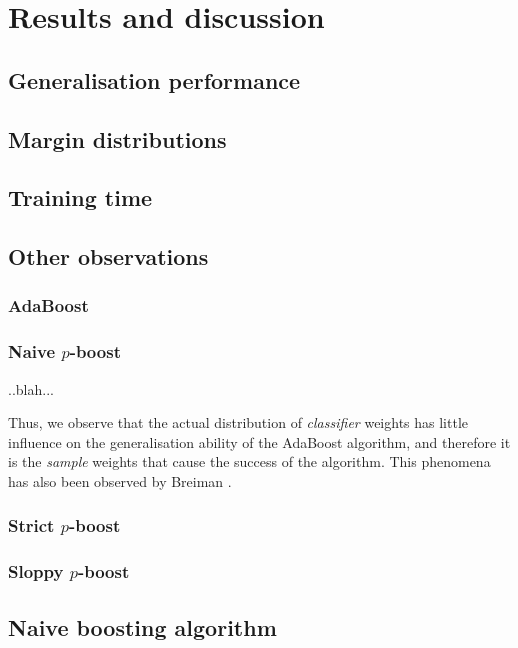 
\chapter{Results and discussion}
\label{chapter:results}

\section{Generalisation performance}


\section{Margin distributions}

\section{Training time}

\section{Other observations}

\subsection{AdaBoost}

\subsection{Naive $p$-boost}

..blah...

Thus, we observe that the actual distribution of \emph{classifier} weights has little influence on the generalisation ability of the AdaBoost algorithm, and therefore it is the \emph{sample} weights that cause the success of the algorithm.  This phenomena has also been observed by Breiman \cite{Breiman96}.


\subsection{Strict $p$-boost}

\subsection{Sloppy $p$-boost}





\section{Naive boosting algorithm}


